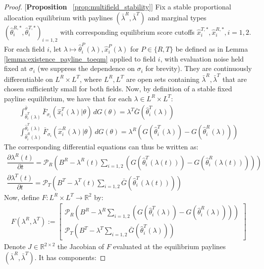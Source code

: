 \begin{proof}{[\textbf{Proposition} ~\ref{prop:multifield_stability}]}
Fix a stable proportional allocation equilibrium with paylines $(\bar{\lambda}^{R},\bar{\lambda}^{T})$ and marginal types $(\hat{\theta}^{R,*}_i, \hat{\theta}^{T,*}_i)_{i=1,2}$ with corresponding equilibrium score cutoffs $\hat{x}^{T,*}_i,\hat{x}^{R,*}_i, i=1,2$. For each field $i$, let $\lambda\mapsto \hat{\theta}^P_i(\lambda),\hat{x}^P_i(\lambda)$ for $P\in \{R,T\}$ be defined as in Lemma \ref{lemma:existence_payline_toeqm} applied to field $i$, with evaluation noise held fixed at $\sigma_i$ (we suppress the dependence on $\sigma_i$ for brevity). They are continuously differentiable on $L^R\times L^T$, where $L^R,L^T$ are open sets containing $\bar{\lambda}^R,\bar{\lambda}^T$ that are chosen sufficiently small for both fields. Now, by definition of a stable fixed payline equilibrium, we have that for each $\lambda\in L^R\times L^T$:
\begin{gather*}
  \int_{\hat{\theta}_i^{T}(\lambda)}^{\bar{\theta}}\bar{F}_{\sigma_i}(\hat{x}^{T}_i(\lambda)|\theta) \,dG(\theta) = \lambda^T\bar{G}(\hat{\theta}^T_i(\lambda)) \\ 
  \int_{\hat{\theta}_i^{R}(\lambda)}^{\hat{\theta}_i^{T}(\lambda)}\bar{F}_{\sigma_i}(\hat{x}^{R}_i(\lambda)|\theta) \,dG(\theta) = \lambda^R(G(\hat{\theta}^{T}_i(\lambda)) - G(\hat{\theta}^{R}_i(\lambda)))
\end{gather*}
The corresponding differential equations can thus be written as:
\begin{gather*}
  \dfrac{\partial \lambda^R(t)}{\partial t} = \mathcal{P}_R\left(B^R -  \lambda^R(t)\sum_{i=1,2}(G(\hat{\theta}^{T}_i(\lambda(t))) - G(\hat{\theta}^{R}_i(\lambda(t))))\right) \\ 
  \dfrac{\partial \lambda^T(t)}{\partial t} = \mathcal{P}_T\left(B^T - \lambda^T(t)\sum_{i=1,2}\bar{G}(\hat{\theta}_i^T(\lambda(t)))\right)
\end{gather*}
Now, define $F:L^R\times L^T\rightarrow \mathbb{R}^2$ by:
\begin{align*}
  F(\lambda^R,\lambda^T) := \begin{bmatrix}\mathcal{P}_R\left(B^R -  \lambda^R\sum_{i=1,2}(G(\hat{\theta}^{T}_i(\lambda)) - G(\hat{\theta}^{R}_i(\lambda)))\right)  \\ \mathcal{P}_T\left(B^T - \lambda^T\sum_{i=1,2}\bar{G}(\hat{\theta}_i^T(\lambda))\right) \end{bmatrix}
\end{align*}
Denote $J\in \mathbb{R}^{2\times 2}$ the Jacobian of $F$ evaluated at the equilibrium paylines $(\bar{\lambda}^R,\bar{\lambda}^T)$. It has components:

\end{proof}
